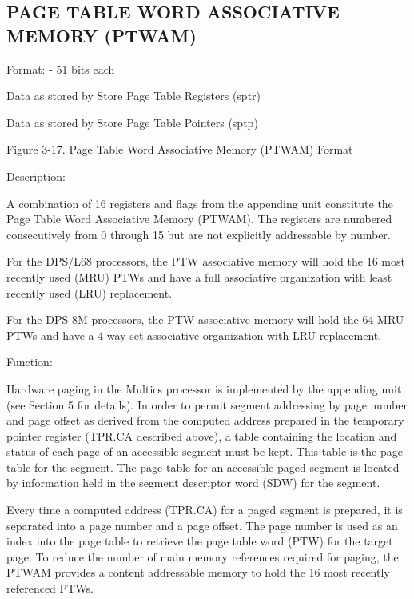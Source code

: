 \subsection{PAGE TABLE WORD ASSOCIATIVE MEMORY (PTWAM)}

Format: - 51 bits each

Data as stored by Store Page Table Registers (sptr)

Data as stored by Store Page Table Pointers (sptp)

Figure 3-17. Page Table Word Associative Memory (PTWAM) Format

Description:

A combination of 16 registers and flags from the appending unit constitute the
Page Table Word Associative Memory (PTWAM). The registers are numbered
consecutively from 0 through 15 but are not explicitly addressable by number.

For the DPS/L68 processors, the PTW associative memory will hold the 16 most
recently used (MRU) PTWs and have a full associative organization with least
recently used (LRU) replacement.

For the DPS 8M processors, the PTW associative memory will hold the 64 MRU PTWs
and have a 4-way set associative organization with LRU replacement.

Function:

Hardware paging in the Multics processor is implemented by the appending unit
(see Section 5 for details). In order to permit segment addressing by page
number and page offset as derived from the computed address prepared in the
temporary pointer register (TPR.CA described above), a table containing the
location and status of each page of an accessible segment must be kept. This
table is the page table for the segment. The page table for an accessible paged
segment is located by information held in the segment descriptor word (SDW) for
the segment.

Every time a computed address (TPR.CA) for a paged segment is prepared, it is
separated into a page number and a page offset. The page number is used as an
index into the page table to retrieve the page table word (PTW) for the target
page. To reduce the number of main memory references required for paging, the
PTWAM provides a content addressable memory to hold the 16 most recently
referenced PTWs.


